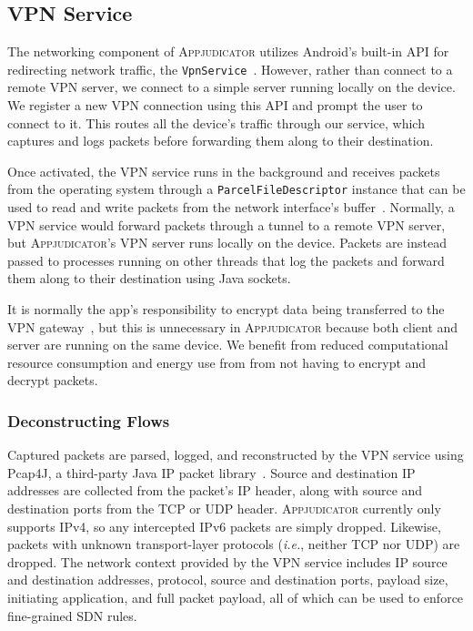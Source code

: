 \subsection{VPN Service}
\label{sec:implementation-vpn-service}

The networking component of \textsc{Appjudicator} utilizes Android's built-in
API for redirecting network traffic, the
\texttt{VpnService}~\cite{googledevelopers2020vpn}. However, rather than connect
to a remote VPN server, we connect to a simple server running locally on the
device. We register a new VPN connection using this API and prompt the user to
connect to it. This routes all the device's traffic through our service, which
captures and logs packets before forwarding them along to their destination.

Once activated, the VPN service runs in the background and receives packets from
the operating system through a \texttt{ParcelFileDescriptor} instance that can
be used to read and write packets from the network interface's
buffer~\cite{vpnguide}.  Normally, a VPN service would forward packets through a
tunnel to a remote VPN server, but \textsc{Appjudicator}'s VPN server runs
locally on the device.  Packets are instead passed to processes running on other
threads that log the packets and forward them along to their destination using
Java sockets.

It is normally the app's responsibility to encrypt data being transferred to the
VPN gateway~\cite{vpnguide}, but this is unnecessary in \textsc{Appjudicator}
because both client and server are running on the same device. We benefit from
reduced computational resource consumption and energy use from from not having
to encrypt and decrypt packets.

\subsubsection{Deconstructing Flows}
\label{sec:deconstructing-flows}

Captured packets are parsed, logged, and reconstructed by the VPN service using
Pcap4J, a third-party Java IP packet library~\cite{kaito2016}. Source and
destination IP addresses are collected from the packet's IP header, along with
source and destination ports from the TCP or UDP header. \textsc{Appjudicator}
currently only supports IPv4, so any intercepted IPv6 packets are simply
dropped. Likewise, packets with unknown transport-layer protocols
(\textit{i.e.}, neither TCP nor UDP) are dropped. The network context provided
by the VPN service includes IP source and destination addresses, protocol,
source and destination ports, payload size, initiating application, and full
packet payload, all of which can be used to enforce fine-grained SDN rules.

